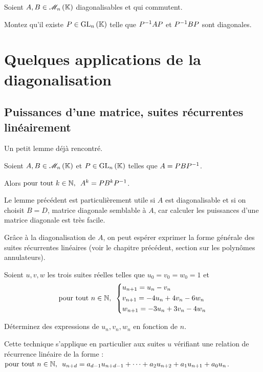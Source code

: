 \begin{exo}
Soient \(A,B\in\M{n}\) diagonalisables et qui commutent.

Montez qu'il existe \(P\in\GL{n}\) telle que \(P^{-1} AP\) et \(P^{-1} BP\) sont diagonales.
\end{exo}

\section{Quelques applications de la diagonalisation}

\subsection{Puissances d'une matrice, suites récurrentes linéairement}

Un petit lemme déjà rencontré.

\begin{lem}
Soient \(A,B\in\M{n}\) et \(P\in\GL{n}\) telles que \(A=PBP^{-1}\).

Alors \(\quantifs{\tpt k\in\N}A^k=PB^kP\inv\).
\end{lem}

Le lemme précédent est particulièrement utile si \(A\) est diagonalisable et si on choisit \(B=D\), matrice diagonale semblable à \(A\), car calculer les puissances d'une matrice diagonale est très facile.

Grâce à la diagonalisation de \(A\), on peut espérer exprimer la forme générale des suites récurrentes linéaires (voir le chapitre précédent, section sur les polynômes annulateurs).

\begin{exo}
Soient \(u,v,w\) les trois suites réelles telles que \(u_0=v_0=w_0=1\) et \[\quantifs{\tpt n\in\N}\begin{dcases}
u_{n+1}=u_n-v_n \\
v_{n+1}=-4u_n+4v_n-6w_n \\
w_{n+1}=-3u_n+3v_n-4w_n
\end{dcases}\]

Déterminez des expressions de \(u_n,v_n,w_n\) en fonction de \(n\).
\end{exo}

Cette technique s'applique en particulier aux suites \(u\) vérifiant une relation de récurrence linéaire de la forme : \(\quantifs{\tpt n\in\N}u_{n+d}=a_{d-1}u_{n+d-1}+\dots+a_2u_{n+2}+a_1u_{n+1}+a_0u_n\).

